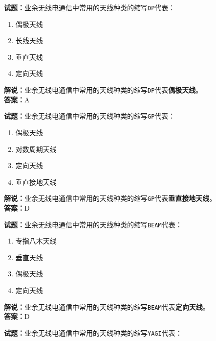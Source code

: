 \documentclass{ctexbook}
\begin{document}
\vspace{\baselineskip}

\noindent\textbf{试题：}业余无线电通信中常用的天线种类的缩写\texttt{DP}代表：

\begin{enumerate}[leftmargin=3em]
  \item 偶极天线
  \item 长线天线
  \item 垂直天线
  \item 定向天线
\end{enumerate}

\noindent\textbf{解说：}业余无线电通信中常用的天线种类的缩写\texttt{DP}代表\textbf{偶极天线}。\\\noindent\textbf{答案：}A

\vspace{\baselineskip}

\noindent\textbf{试题：}业余无线电通信中常用的天线种类的缩写\texttt{GP}代表：

\begin{enumerate}[leftmargin=3em]
  \item 偶极天线
  \item 对数周期天线
  \item 定向天线
  \item 垂直接地天线
\end{enumerate}

\noindent\textbf{解说：}业余无线电通信中常用的天线种类的缩写\texttt{GP}代表\textbf{垂直接地天线}。\\\noindent\textbf{答案：}D

\vspace{\baselineskip}

\noindent\textbf{试题：}业余无线电通信中常用的天线种类的缩写\texttt{BEAM}代表：

\begin{enumerate}[leftmargin=3em]
  \item 专指八木天线
  \item 垂直天线
  \item 偶极天线
  \item 定向天线
\end{enumerate}

\noindent\textbf{解说：}业余无线电通信中常用的天线种类的缩写\texttt{BEAM}代表\textbf{定向天线}。\\\noindent\textbf{答案：}D

\vspace{\baselineskip}

\noindent\textbf{试题：}业余无线电通信中常用的天线种类的缩写\texttt{YAGI}代表：
\end{document}
